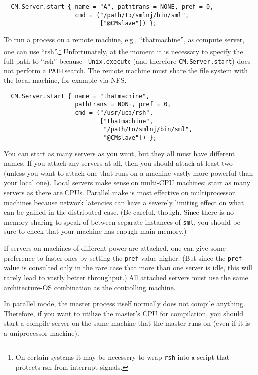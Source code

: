 \documentclass{article}
\begin{document}
\begin{verbatim}
  CM.Server.start { name = "A", pathtrans = NONE, pref = 0,
                    cmd = ("/path/to/smlnj/bin/sml",
                           ["@CMslave"]) };
\end{verbatim}

To run a process on a remote machine, e.g., ``thatmachine'', as
compute server, one can use ``rsh''.\footnote{On certain systems it
may be necessary to wrap {\tt rsh} into a script that protects rsh
from interrupt signals.}  Unfortunately, at the moment it
is necessary to specify the full path to ``rsh'' because {\tt
Unix.execute} (and therefore {\tt CM.Server.start}) does not perform
a {\tt PATH} search. The remote machine
must share the file system with the local machine, for example via NFS.

\begin{verbatim}
  CM.Server.start { name = "thatmachine",
                    pathtrans = NONE, pref = 0,
                    cmd = ("/usr/ucb/rsh",
                           ["thatmachine",
                            "/path/to/smlnj/bin/sml",
                            "@CMslave"]) };
\end{verbatim}

You can start as many servers as you want, but they all must have
different names.  If you attach any servers at all, then you should
attach at least two (unless you want to attach one that runs on a
machine vastly more powerful than your local one).  Local servers make
sense on multi-CPU machines: start as many servers as there are CPUs.
Parallel make is most effective on multiprocessor machines because
network latencies can have a severely limiting effect on what can be
gained in the distributed case.
(Be careful, though.  Since there is no memory-sharing to speak of
between separate instances of {\tt sml}, you should be sure to check
that your machine has enough main memory.)

If servers on machines of different power are attached, one can give
some preference to faster ones by setting the {\tt pref} value higher.
(But since the {\tt pref} value is consulted only in the rare case
that more than one server is idle, this will rarely lead to vastly
better throughput.) All attached servers must use the same
architecture-OS combination as the controlling machine.

In parallel mode, the master process itself normally does not compile
anything.  Therefore, if you want to utilize the master's CPU for
compilation, you should start a compile server on the same machine
that the master runs on (even if it is a uniprocessor machine).
\end{document}
